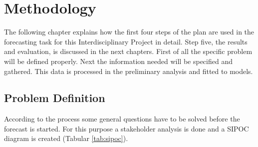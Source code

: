 \chapter{Methodology}\label{chapter:Methodology}
The following chapter explains how the first four steps of the plan are used in the forecasting task for this Interdisciplinary Project in detail. Step five, the results and evaluation, is discussed in the next chapters.\newline
First of all the specific problem will be defined properly. Next the information needed will be specified and gathered. This data is processed in the preliminary analysis and fitted to models.
\section{Problem Definition}\label{section:Problem Definition}
According to the process some general questions have to be solved before the forecast is started. For this purpose a stakeholder analysis is done and a SIPOC diagram is created (Tabular \ref{tab:sipoc}).

